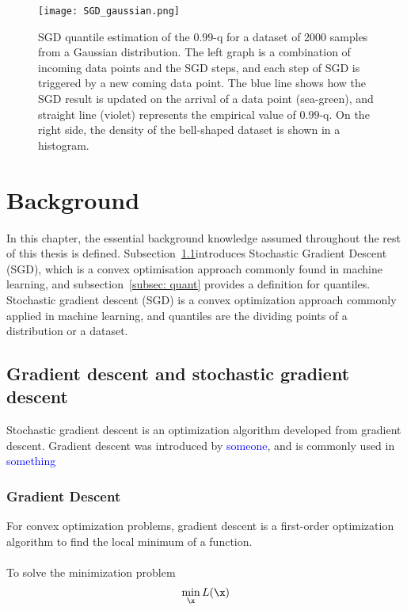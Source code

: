 \begin{figure*}[h!]
	\texttt{[image: SGD\_gaussian.png]}
    \caption{SGD quantile estimation of the $0.99$-q for a dataset of 2000 samples from a Gaussian distribution. The left graph is a combination of incoming data points and the SGD steps, and each step of SGD is triggered by a new coming data point. The blue line shows how the SGD result is updated on the arrival of a data point (sea-green), and straight line (violet) represents the empirical value of $0.99$-q. On the right side, the density of the bell-shaped dataset is shown in a histogram.}
    \label{fig: SGD_quant}
\end{figure*}


\section{Background}

In this chapter, the essential background knowledge assumed throughout the rest of this thesis is defined. Subsection~\ref{subsec: sgd}introduces Stochastic Gradient Descent (SGD), which is a convex optimisation approach commonly found in machine learning, and subsection~\ref{subsec: quant} provides a definition for quantiles.
Stochastic gradient descent (SGD) is a convex optimization approach commonly applied in machine learning, and quantiles are the dividing points of a distribution or a dataset.

    \subsection{Gradient descent and stochastic gradient descent}
    \label{subsec: sgd}
    Stochastic gradient descent is an optimization algorithm developed from gradient descent. 
    Gradient descent was introduced by \textcolor{blue}{someone}, and is commonly used in \textcolor{blue}{something}

    \subsubsection{Gradient Descent}
        For convex optimization problems, gradient descent is a first-order optimization algorithm 
        to find the local minimum of a function.
        \\\\
        To solve the minimization problem 
        \begin{equation}
            \min_{\x} L(\x) 
        \end{equation} 
        
